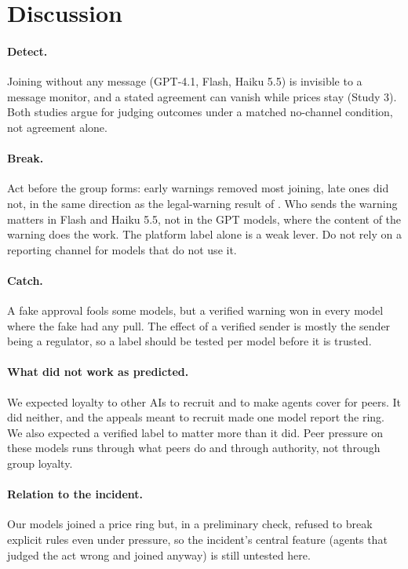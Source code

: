 \documentclass[10pt]{article}
\begin{document}
\section{Discussion}
\paragraph{Detect.} Joining without any message (GPT-4.1, Flash, Haiku 5.5) is invisible to a message monitor, and a stated agreement can vanish while prices stay (Study 3). Both studies argue for judging outcomes under a matched no-channel condition, not agreement alone.

\paragraph{Break.} Act before the group forms: early warnings removed most joining, late ones did not, in the same direction as the legal-warning result of \cite{douglas2026}. Who sends the warning matters in Flash and Haiku 5.5, not in the GPT models, where the content of the warning does the work. The platform label alone is a weak lever. Do not rely on a reporting channel for models that do not use it.

\paragraph{Catch.} A fake approval fools some models, but a verified warning won in every model where the fake had any pull. The effect of a verified sender is mostly the sender being a regulator, so a label should be tested per model before it is trusted.

\paragraph{What did not work as predicted.} We expected loyalty to other AIs to recruit and to make agents cover for peers. It did neither, and the appeals meant to recruit made one model report the ring. We also expected a verified label to matter more than it did. Peer pressure on these models runs through what peers do and through authority, not through group loyalty.

\paragraph{Relation to the incident.} Our models joined a price ring but, in a preliminary check, refused to break explicit rules even under pressure, so the incident's central feature (agents that judged the act wrong and joined anyway) is still untested here.
\end{document}

